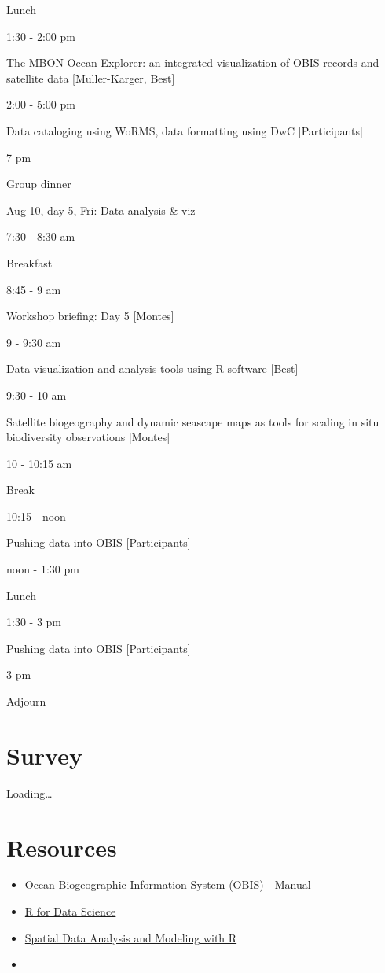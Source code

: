 \documentclass[]{book}
\providecommand{\tightlist}{%
  \setlength{\itemsep}{0pt}\setlength{\parskip}{0pt}}
\theoremstyle{definition}
\theoremstyle{definition}
\theoremstyle{definition}
\theoremstyle{remark}
\begin{document}
Lunch

1:30 - 2:00 pm

The MBON Ocean Explorer: an integrated visualization of OBIS records and
satellite data {[}Muller-Karger, Best{]}

2:00 - 5:00 pm

Data cataloging using WoRMS, data formatting using DwC
{[}Participants{]}

7 pm

Group dinner

Aug 10, day 5, Fri: Data analysis \& viz

7:30 - 8:30 am

Breakfast

8:45 - 9 am

Workshop briefing: Day 5 {[}Montes{]}

9 - 9:30 am

Data visualization and analysis tools using R software {[}Best{]}

9:30 - 10 am

Satellite biogeography and dynamic seascape maps as tools for scaling in
situ biodiversity observations {[}Montes{]}

10 - 10:15 am

Break

10:15 - noon

Pushing data into OBIS {[}Participants{]}

noon - 1:30 pm

Lunch

1:30 - 3 pm

Pushing data into OBIS {[}Participants{]}

3 pm

Adjourn

\hypertarget{survey}{%
\section{Survey}\label{survey}}

Loading\ldots{}

\hypertarget{resources}{%
\section{Resources}\label{resources}}

\begin{itemize}
\tightlist
\item
  \href{http://www.iobis.org/manual/}{Ocean Biogeographic Information
  System (OBIS) - Manual}
\item
  \href{http://r4ds.had.co.nz/}{R for Data Science}
\item
  \href{http://rspatial.org}{Spatial Data Analysis and Modeling with R}
\item
  \citep{hijmans_species_2017}
\end{itemize}


\end{document}
